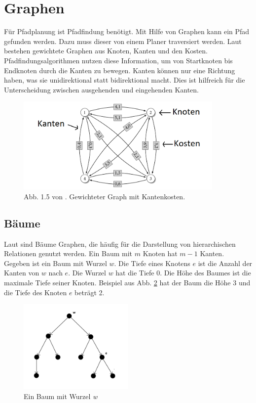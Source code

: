 \section{Graphen}
Für Pfadplanung ist Pfadfindung benötigt. Mit Hilfe von Graphen kann ein Pfad gefunden werden. Dazu muss dieser von einem Planer traversiert werden. Laut \cite{Turau:15} bestehen gewichtete Graphen aus Knoten, Kanten und den Kosten. Pfadfindungsalgorithmen nutzen diese Information, um von Startknoten bis Endknoten durch die Kanten zu bewegen. Kanten können nur eine Richtung haben, was sie unidirektional statt bidirektional macht. Dies ist hilfreich für die Unterscheidung zwischen ausgehenden und eingehenden Kanten.

\begin{figure} %
	\centering
	\includegraphics[width=0.9\textwidth]{images/kk_graph_S6.png}
	\caption{Abb. 1.5 von \cite[~S. 6]{Turau:15}. Gewichteter Graph mit Kantenkosten.}
	\label{sec0a}
\end{figure}

\subsection{Bäume}
Laut \cite{Turau:15} sind Bäume Graphen, die häufig für die Darstellung von hierarchischen Relationen genutzt werden. Ein Baum mit $m$ Knoten hat $m-1$ Kanten.\\
Gegeben ist ein Baum mit Wurzel $w$. Die Tiefe eines Knotens $e$ ist die Anzahl der Kanten von $w$ nach $e$. Die Wurzel $w$ hat die Tiefe 0. Die Höhe des Baumes ist die maximale Tiefe seiner Knoten. Beispiel aus Abb. \ref{sec0b} hat der Baum die Höhe 3 und die Tiefe des Knoten $e$ beträgt 2.

\begin{figure} %
	\centering
	\includegraphics[width=0.5\textwidth]{images/Tree_Graph.png}
	\caption{Ein Baum mit Wurzel \textit{w}}
	\label{sec0b}
\end{figure}

